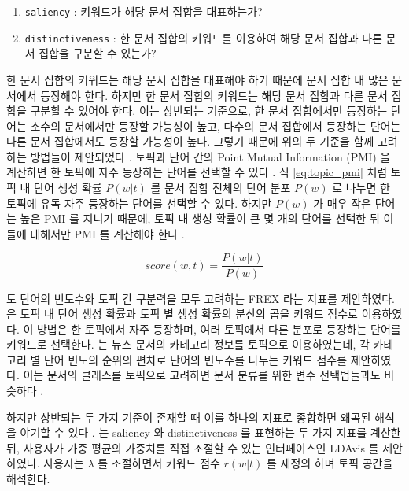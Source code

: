 \documentclass[oneside, ko,phd]{snuthesis_utf8_kor}
\begin{document}
\begin{enumerate}
  \item \texttt{saliency} : 키워드가 해당 문서 집합을 대표하는가?
  \item \texttt{distinctiveness} : 한 문서 집합의 키워드를 이용하여 해당 문서 집합과 다른 문서 집합을 구분할 수 있는가?
\end{enumerate}

한 문서 집합의 키워드는 해당 문서 집합을 대표해야 하기 때문에 문서 집합 내 많은 문서에서 등장해야 한다.
하지만 한 문서 집합의 키워드는 해당 문서 집합과 다른 문서 집합을 구분할 수 있어야 한다.
이는 상반되는 기준으로, 한 문서 집합에서만 등장하는 단어는 소수의 문서에서만 등장할 가능성이 높고, 다수의 문서 집합에서 등장하는 단어는 다른 문서 집합에서도 등장할 가능성이 높다.
그렇기 때문에 위의 두 기준을 함께 고려하는 방법들이 제안되었다 \cite{bischof2012summarizing, newman2010evaluating, taddy2012estimation}.
토픽과 단어 간의 Point Mutual Information (PMI) 을 계산하면 한 토픽에 자주 등장하는 단어를 선택할 수 있다 \cite{newman2010evaluating, taddy2012estimation, mimno2011optimizing}.
식 \ref{eq:topic_pmi} 처럼 토픽 내 단어 생성 확률 $P(w \vert t)$ 를 문서 집합 전체의 단어 분포 $P(w)$ 로 나누면 한 토픽에 유독 자주 등장하는 단어를 선택할 수 있다.
하지만 $P(w)$ 가 매우 작은 단어는 높은 PMI 를 지니기 때문에, 토픽 내 생성 확률이 큰 몇 개의 단어를 선택한 뒤 이들에 대해서만 PMI 를 계산해야 한다 \cite{newman2010evaluating, alsumait2009topic}.

\begin{equation}
  \label{eq:topic_pmi}
  score(w,t) = \frac{P(w \vert t)}{P(w)}
\end{equation}

\cite{bischof2012summarizing} 도 단어의 빈도수와 토픽 간 구분력을 모두 고려하는 FREX 라는 지표를 제안하였다.
\cite{song2009topic} 은 토픽 내 단어 생성 확률과 토픽 별 생성 확률의 분산의 곱을 키워드 점수로 이용하였다.
이 방법은 한 토픽에서 자주 등장하며, 여러 토픽에서 다른 분포로 등장하는 단어를 키워드로 선택한다.
\cite{lee2008news} 는 뉴스 문서의 카테고리 정보를 토픽으로 이용하였는데, 각 카테고리 별 단어 빈도의 순위의 편차로 단어의 빈도수를 나누는 키워드 점수를 제안하였다.
이는 문서의 클래스를 토픽으로 고려하면 문서 분류를 위한 변수 선택법들과도 비슷하다 \cite{largeron2011entropy, popescul2000automatic}.

하지만 상반되는 두 가지 기준이 존재할 때 이를 하나의 지표로 종합하면 왜곡된 해석을 야기할 수 있다 \cite{chuang2012interpretation}.
\cite{sievert2014ldavis}는 saliency 와 distinctiveness 를 표현하는 두 가지 지표를 계산한 뒤, 사용자가 가중 평균의 가중치를 직접 조절할 수 있는 인터페이스인 LDAvis 를 제안하였다.
사용자는 $\lambda$ 를 조절하면서 키워드 점수 $r(w \vert t)$ 를 재정의 하며 토픽 공간을 해석한다.
\end{document}
